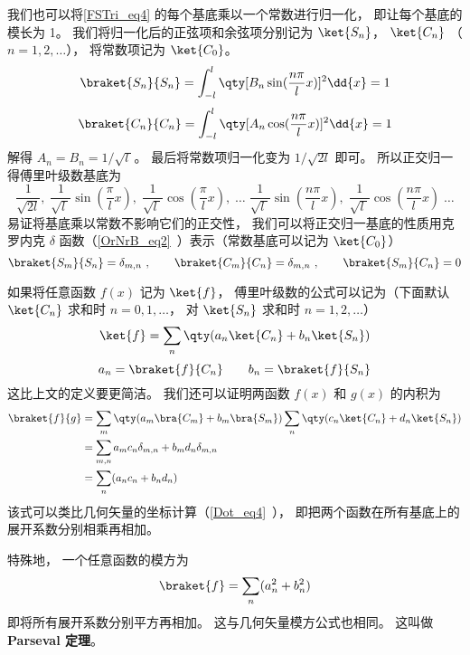我们也可以将\autoref{FSTri_eq4} 的每个基底乘以一个常数进行归一化， 即让每个基底的模长为 1。 我们将归一化后的正弦项和余弦项分别记为 $\ket{S_n}$， $\ket{C_n}$ （$n = 1, 2,\dots$）， 将常数项记为 $\ket{C_0}$。
\begin{equation}
\braket{S_n}{S_n} = \int_{-l}^l \qty[B_n \sin(\frac{n\pi}{l}x)]^2 \dd{x} = 1
\end{equation}
\begin{equation}
\braket{C_n}{C_n} = \int_{-l}^l \qty[A_n \cos(\frac{n\pi}{l}x)]^2 \dd{x} = 1
\end{equation}
解得 $A_n = B_n = 1/\sqrt{l\ }$。 最后将常数项归一化变为 $1/\sqrt{2l}$ 即可。 所以正交归一得傅里叶级数基底为
\begin{equation}
\frac{1}{\sqrt{2l}},\;   \frac{1}{\sqrt{l\ }}\sin(\frac{\pi}{l} x),\;   \frac{1}{\sqrt{l\ }}\cos(\frac{\pi}{l} x),\;   \dots\;  \frac{1}{\sqrt{l\ }}\sin(\frac{n\pi}{l} x),\;   \frac{1}{\sqrt{l\ }}\cos(\frac{n\pi}{l} x)\;   \dots
\end{equation}
易证将基底乘以常数不影响它们的正交性， 我们可以将正交归一基底的性质用克罗内克 $\delta$ 函数（\autoref{OrNrB_eq2}~）表示（常数基底可以记为 $\ket{C_0}$）
\begin{equation}
\braket{S_m}{S_n} = \delta_{m,n}~,
\qquad
\braket{C_m}{C_n} = \delta_{m, n}~,
\qquad
\braket{S_m}{C_n} = 0
\end{equation}

如果将任意函数 $f(x)$ 记为 $\ket{f}$， 傅里叶级数的公式可以记为（下面默认 $\ket{C_n}$ 求和时 $n = 0, 1, \dots$， 对 $\ket{S_n}$ 求和时 $n = 1, 2, \dots$）
\begin{equation}
\ket{f} = \sum_n \qty(a_n \ket{C_n} + b_n \ket{S_n})
\end{equation}
\begin{equation}
a_n = \braket{f}{C_n}
\qquad
b_n = \braket{f}{S_n}
\end{equation}
这比上文的定义要更简洁。 我们还可以证明两函数 $f(x)$ 和 $g(x)$ 的内积为
\begin{equation}
\begin{aligned}
\braket{f}{g} &= \sum_m \qty(a_m \bra{C_m} + b_m \bra{S_m}) \sum_n \qty(c_n \ket{C_n} + d_n \ket{S_n})\\
&= \sum_{m, n} a_m c_n \delta_{m, n} + b_m d_n \delta_{m, n}\\
&= \sum_n (a_n c_n + b_n d_n)
\end{aligned}
\end{equation}
该式可以类比几何矢量的坐标计算（\autoref{Dot_eq4}~）， 即把两个函数在所有基底上的展开系数分别相乘再相加。

特殊地， 一个任意函数的模方为
\begin{equation}
\braket{f} = \sum_n (a_n^2 + b_n^2)
\end{equation}
即将所有展开系数分别平方再相加。 这与几何矢量模方公式也相同。 这叫做 \textbf{Parseval 定理}。
